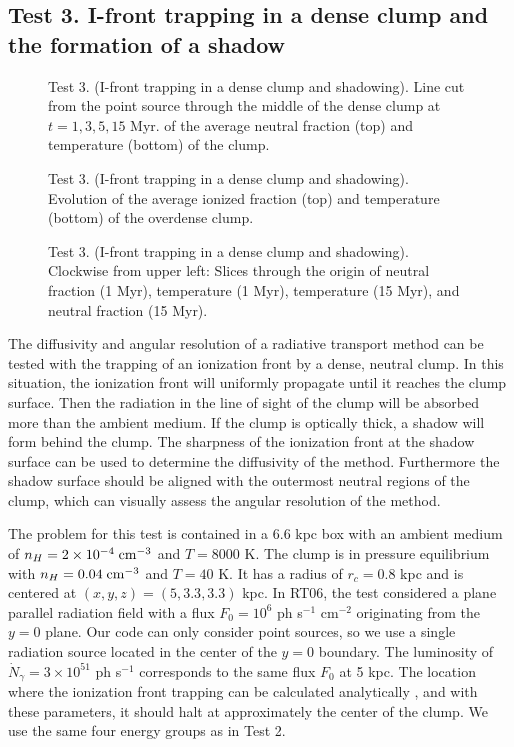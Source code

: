 \documentclass[useAMS,usenatbib,a4paper]{mn2e}
\begin{document}
\subsection{Test 3. I-front trapping in a dense clump and the
  formation of a shadow}
\label{sec:test3}

\begin{figure}
  \caption{\label{fig:test3_1} Test 3. (I-front trapping in a dense
    clump and shadowing).  Line cut from the point source through the
    middle of the dense clump at $t = 1, 3, 5, 15$ Myr.  of the
    average neutral fraction (top) and temperature (bottom) of the
    clump.}
\end{figure}

\begin{figure}
  \caption{\label{fig:test3_2} Test 3. (I-front trapping in a dense
    clump and shadowing).  Evolution of the average ionized fraction
    (top) and temperature (bottom) of the overdense clump.}
\end{figure}

\begin{figure*}
  \caption{\label{fig:test3_3} Test 3. (I-front trapping in a dense
    clump and shadowing).  Clockwise from upper left: Slices through
    the origin of neutral fraction (1 Myr), temperature (1 Myr),
    temperature (15 Myr), and neutral fraction (15 Myr).}
\end{figure*}

The diffusivity and angular resolution of a radiative transport method
can be tested with the trapping of an ionization front by a dense,
neutral clump.  In this situation, the ionization front will uniformly
propagate until it reaches the clump surface.  Then the radiation in
the line of sight of the clump will be absorbed more than the ambient
medium.  If the clump is optically thick, a shadow will form behind
the clump.  The sharpness of the ionization front at the shadow
surface can be used to determine the diffusivity of the method.
Furthermore the shadow surface should be aligned with the outermost
neutral regions of the clump, which can visually assess the angular
resolution of the method.

The problem for this test is contained in a 6.6 kpc box with an
ambient medium of $n_H = 2 \times 10^{-4}\;\cubecm$ and $T = 8000$ K.
The clump is in pressure equilibrium with $n_H = 0.04\; \cubecm$ and
$T = 40$ K.  It has a radius of $r_c = 0.8$ kpc and is centered at
$(x,y,z) = (5, 3.3, 3.3)$ kpc.  In RT06, the test considered a plane
parallel radiation field with a flux $F_0 = 10^6$ ph s$^{-1}$
cm$^{-2}$ originating from the $y=0$ plane.  Our code can only
consider point sources, so we use a single radiation source located in
the center of the $y=0$ boundary.  The luminosity of $\dot{N}_\gamma =
3 \times 10^{51}$ ph s$^{-1}$ corresponds to the same flux $F_0$ at 5
kpc.  The location where the ionization front trapping can be
calculated analytically \citep{Shapiro04}, and with these parameters,
it should halt at approximately the center of the clump.  We use the
same four energy groups as in Test 2.
\end{document}
